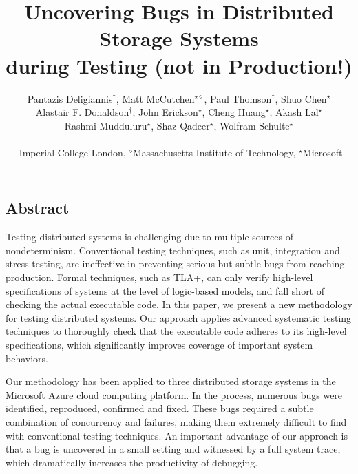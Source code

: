 \documentclass[letterpaper,twocolumn,10pt]{article}
\begin{document}
\date{}

\title{\Large \bf Uncovering Bugs in Distributed Storage Systems\\during Testing (not in Production!)}

\author{
{\rm Pantazis Deligiannis$^\dagger$, Matt McCutchen$^{\star\diamond}$, Paul Thomson$^\dagger$, Shuo Chen$^\star$}\\
{\rm Alastair F. Donaldson$^\dagger$, John Erickson$^\star$, Cheng Huang$^\star$, Akash Lal$^\star$}\\
{\rm Rashmi Mudduluru$^\star$, Shaz Qadeer$^\star$, Wolfram Schulte$^\star$}\\\\
$^\dagger$Imperial College London, $^\diamond$Massachusetts Institute of Technology, $^\star$Microsoft\\
} %

\maketitle

\thispagestyle{empty}

\subsection*{Abstract}
Testing distributed systems is challenging due to multiple sources of nondeterminism. Conventional testing techniques, such as unit, integration and stress testing, are ineffective in preventing serious but subtle bugs from reaching production. Formal techniques, such as TLA+, can only verify high-level specifications of systems at the level of logic-based models, and fall short of checking the actual executable code. In this paper, we present a new methodology for testing distributed systems. Our approach applies advanced systematic testing techniques to thoroughly check that the executable code adheres to its high-level specifications, which significantly improves coverage of important system behaviors.

Our methodology has been applied to three distributed storage systems in the Microsoft Azure cloud computing platform. In the process, numerous bugs were identified, reproduced, confirmed and fixed. These bugs required a subtle combination of concurrency and failures, making them extremely difficult to find with conventional testing techniques. An important advantage of our approach is that a bug is uncovered in a small setting and witnessed by a full system trace, which dramatically increases the productivity of debugging.
\end{document}

